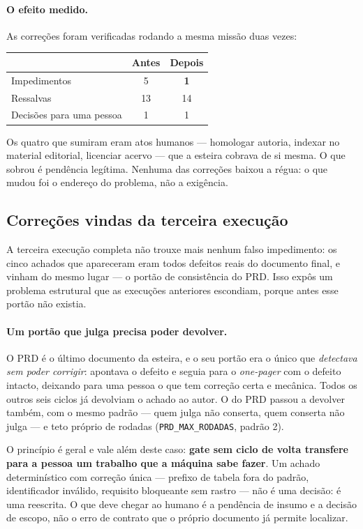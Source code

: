 \documentclass[11pt,a4paper]{article}
\newcommand{\cod}[1]{\texttt{\small #1}}
\begin{document}
\paragraph{O efeito medido.} As correções foram verificadas rodando a mesma missão duas vezes:

\begin{center}
\begin{tabular}{lcc}
\toprule
 & \textbf{Antes} & \textbf{Depois} \\
\midrule
Impedimentos & 5 & \textbf{1} \\
Ressalvas & 13 & 14 \\
Decisões para uma pessoa & 1 & 1 \\
\bottomrule
\end{tabular}
\end{center}

\noindent
Os quatro que sumiram eram atos humanos --- homologar autoria, indexar no material editorial,
licenciar acervo --- que a esteira cobrava de si mesma. O que sobrou é pendência legítima. Nenhuma
das correções baixou a régua: o que mudou foi o endereço do problema, não a exigência.

\subsection{Correções vindas da terceira execução}

A terceira execução completa não trouxe mais nenhum falso impedimento: os cinco achados que
apareceram eram todos defeitos reais do documento final, e vinham do mesmo lugar --- o portão de
consistência do PRD. Isso expôs um problema estrutural que as execuções anteriores escondiam,
porque antes esse portão não existia.

\paragraph{Um portão que julga precisa poder devolver.} O PRD é o último documento da esteira, e o
seu portão era o único que \emph{detectava sem poder corrigir}: apontava o defeito e seguia para o
\emph{one-pager} com o defeito intacto, deixando para uma pessoa o que tem correção certa e
mecânica. Todos os outros seis ciclos já devolviam o achado ao autor. O do PRD passou a devolver
também, com o mesmo padrão --- quem julga não conserta, quem conserta não julga --- e teto próprio
de rodadas (\cod{PRD\_MAX\_RODADAS}, padrão 2).

O princípio é geral e vale além deste caso: \textbf{gate sem ciclo de volta transfere para a pessoa
um trabalho que a máquina sabe fazer}. Um achado determinístico com correção única --- prefixo de
tabela fora do padrão, identificador inválido, requisito bloqueante sem rastro --- não é uma decisão:
é uma reescrita. O que deve chegar ao humano é a pendência de insumo e a decisão de escopo, não o
erro de contrato que o próprio documento já permite localizar.
\end{document}
